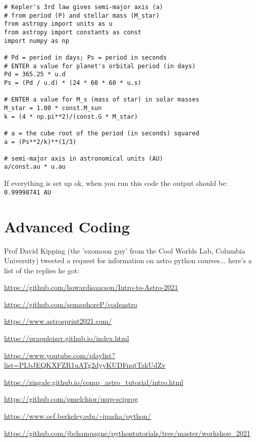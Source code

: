 \documentclass{article}
\newcommand{\code}[1]{\colorbox{light-gray}{\texttt{#1}}}
\begin{document}
\begin{verbatim}
# Kepler's 3rd law gives semi-major axis (a)
# from period (P) and stellar mass (M_star)
from astropy import units as u
from astropy import constants as const
import numpy as np

# Pd = period in days; Ps = period in seconds
# ENTER a value for planet's orbital period (in days)
Pd = 365.25 * u.d 
Ps = (Pd / u.d) * (24 * 60 * 60 * u.s)

# ENTER a value for M_s (mass of star) in solar masses
M_star = 1.00 * const.M_sun 
k = (4 * np.pi**2)/(const.G * M_star)

# a = the cube root of the period (in seconds) squared
a = (Ps**2/k)**(1/3) 

# semi-major axis in astronomical units (AU)
a/const.au * u.au
\end{verbatim}
If everything is set up ok, when you run this code the output should be:
\code{0.99998741 AU}

\section{Advanced Coding}

Prof David Kipping (the 'exomoon guy' from the Cool Worlds Lab, Columbia University) tweeted a request for information on astro python courses... here's a list of the replies he got:

\url{https://github.com/howardisaacson/Intro-to-Astro-2021}

\url{https://github.com/semaphoreP/codeastro}

\url{https://www.astrosprint2021.com/}

\url{https://prappleizer.github.io/index.html}

\url{https://www.youtube.com/playlist?list=PLbJEQKXFZR1uATg2dyyKUDFnqtTzkUdZv}

\url{https://zingale.github.io/comp_astro_tutorial/intro.html}

\url{https://github.com/pmelchior/usrp-sciprog}

\url{https://www.ocf.berkeley.edu/~ipasha/python/}

\url{https://github.com/jbchampagne/pythontutorials/tree/master/workshop_2021}
\end{document}
